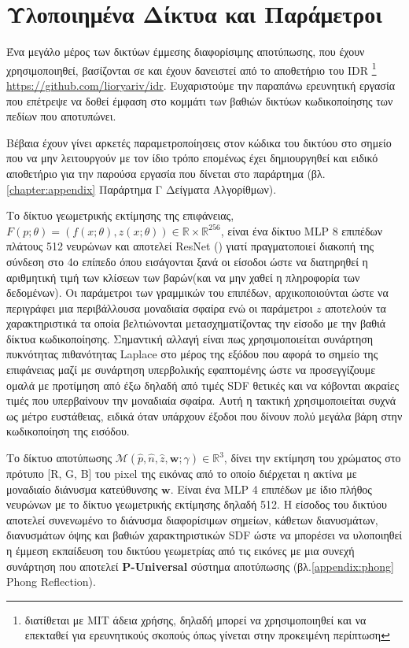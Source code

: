 \section{Υλοποιημένα Δίκτυα και Παράμετροι}
\par
    Ένα μεγάλο μέρος των δικτύων έμμεσης διαφορίσιμης αποτύπωσης, που έχουν χρησιμοποιηθεί, βασίζονται σε  και έχουν δανειστεί από το αποθετήριο του IDR \footnote{διατίθεται με MIT άδεια χρήσης, δηλαδή μπορεί να χρησιμοποιηθεί και να επεκταθεί για ερευνητικούς σκοπούς όπως γίνεται στην προκειμένη περίπτωση} \href{https://github.com/lioryariv/idr}{https://github.com/lioryariv/idr}. Ευχαριστούμε την παραπάνω ερευνητική εργασία που επέτρεψε να δοθεί έμφαση στο κομμάτι των βαθιών δικτύων κωδικοποίησης των πεδίων που αποτυπώνει. 
\par
    Βέβαια έχουν γίνει αρκετές παραμετροποίησεις στον κώδικα του δικτύου στο σημείο που να μην λειτουργούν με τον ίδιο τρόπο επομένως έχει δημιουργηθεί και ειδικό αποθετήριο για την παρούσα εργασία που δίνεται στο παράρτημα (βλ.\ref{chapter:appendix} Παράρτημα Γ Δείγματα Αλγορίθμων). 
\par    
    Το δίκτυο γεωμετρικής εκτίμησης της επιφάνειας,  \(F(p;\theta)=(f(x;\theta), z(x;\theta)) \in \mathbb{R} \times \mathbb{R}^{256} \), είναι ένα δίκτυο MLP 8 επιπέδων πλάτους 512 νευρώνων και αποτελεί ResNet () γιατί πραγματοποιεί διακοπή της σύνδεση στο 4ο επίπεδο όπου εισάγονται ξανά οι είσοδοι ώστε να διατηρηθεί η αριθμητική τιμή των κλίσεων των βαρών(και να μην χαθεί η πληροφορία των δεδομένων). Οι παράμετροι των γραμμικών του επιπέδων, αρχικοποιούνται ώστε να περιγράφει μια περιβάλλουσα μοναδιαία σφαίρα ενώ οι παράμετροι $z$ αποτελούν τα  χαρακτηριστικά τα οποία βελτιώνονται μετασχηματίζοντας την είσοδο με την βαθιά δίκτυα κωδικοποίησης. Σημαντική αλλαγή είναι πως χρησιμοποιείται συνάρτηση πυκνότητας πιθανότητας Laplace στο μέρος της εξόδου που αφορά το σημείο της επιφάνειας μαζί με συνάρτηση υπερβολικής εφαπτομένης ώστε να προσεγγίζουμε ομαλά με προτίμηση από έξω δηλαδή από τιμές SDF θετικές και να κόβονται ακραίες τιμές που υπερβαίνουν την μοναδιαία σφαίρα. Αυτή η τακτική  χρησιμοποιείται συχνά ως μέτρο ευστάθειας, ειδικά όταν υπάρχουν έξοδοι που δίνουν πολύ μεγάλα βάρη στην κωδικοποίηση της εισόδου. 

    Το δίκτυο αποτύπωσης $\mathcal{M}(\hat{p}, \hat{n}, \hat{z}, \boldsymbol{w};\gamma) \in \mathbb{R}^3$, δίνει την εκτίμηση του χρώματος στο πρότυπο [R, G, B] του pixel της εικόνας από το οποίο διέρχεται η ακτίνα με μοναδιαίο διάνυσμα κατεύθυνσης $\boldsymbol{w}$. Είναι ένα MLP 4 επιπέδων με ίδιο πλήθος νευρώνων με το δίκτυο γεωμετρικής εκτίμησης δηλαδή 512. Η είσοδος του δικτύου αποτελεί συνενωμένο το διάνυσμα διαφορίσιμων σημείων, κάθετων διανυσμάτων, διανυσμάτων όψης και βαθιών χαρακτηριστικών SDF ώστε να μπορέσει να υλοποιηθεί η έμμεση εκπαίδευση του δικτύου γεωμετρίας από τις εικόνες με μια συνεχή συνάρτηση που αποτελεί \textbf{P-Universal} σύστημα αποτύπωσης (βλ.\ref{appendix:phong} Phong Reflection).

